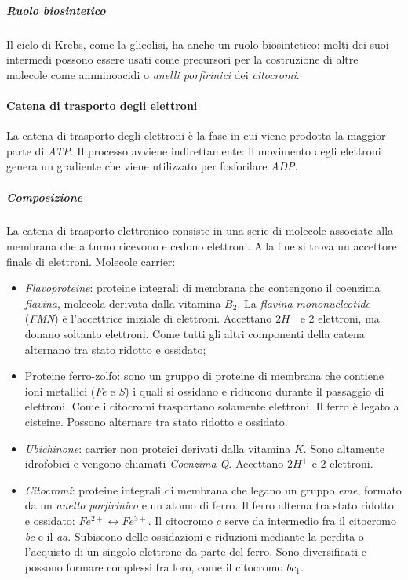					\subparagraph{Ruolo biosintetico}
					Il ciclo di Krebs, come la glicolisi, ha anche un ruolo biosintetico: molti dei suoi intermedi possono essere usati come precursori per la costruzione di altre molecole come amminoacidi o \emph{anelli porfirinici} dei \emph{citocromi}. 

				\paragraph{Catena di trasporto degli elettroni}
				La catena di trasporto degli elettroni \`e la fase in cui viene prodotta la maggior parte di \emph{ATP}.
				Il processo avviene indirettamente: il movimento degli elettroni genera un gradiente che viene utilizzato per fosforilare \emph{ADP}.
				
					\subparagraph{Composizione}	
					La catena di trasporto elettronico consiste in una serie di molecole associate alla membrana che a turno ricevono e cedono elettroni.
					Alla fine si trova un accettore finale di elettroni.
					Molecole carrier:
					\begin{multicols}{2}
						\begin{itemize}
							\item \emph{Flavoproteine}: proteine integrali di membrana che contengono il coenzima \emph{flavina}, molecola derivata dalla vitamina $B_2$. 
								La \emph{flavina mononucleotide} (\emph{FMN}) \`e l'accettrice iniziale di elettroni. 
								Accettano \emph{$2H^{+}$} e $2$ elettroni, ma donano soltanto elettroni. 
								Come tutti gli altri componenti della catena alternano tra stato ridotto e ossidato;
							\item Proteine ferro-zolfo: sono un gruppo di proteine di membrana che contiene ioni metallici (\emph{Fe} e \emph{S}) i quali si ossidano e riducono durante il passaggio di elettroni. 
								Come i citocromi trasportano solamente elettroni.
								Il ferro \`e legato a cisteine. 
								Possono alternare tra stato ridotto e ossidato.
							\item \emph{Ubichinone}: carrier non proteici derivati dalla vitamina $K$.
								Sono altamente idrofobici e vengono chiamati  \emph{Coenzima Q}.
								Accettano \emph{$2H^{+}$} e $2$ elettroni.
							\item \emph{Citocromi}: proteine integrali di membrana che legano un gruppo \emph{eme}, formato da un \emph{anello porfirinico} e un atomo di ferro. 
								Il ferro alterna tra stato ridotto e ossidato: $Fe^{2+}\leftrightarrow Fe^{3+}$. 
								Il citocromo $c$ serve da intermedio fra il citocromo \emph{bc} e il \emph{aa}. 
								Subiscono delle ossidazioni e riduzioni mediante la perdita o l'acquisto di un singolo elettrone da parte del ferro. 
								Sono diversificati e possono formare complessi fra loro, come il citocromo \emph{$bc_1$}.
						\end{itemize}
					\end{multicols}

